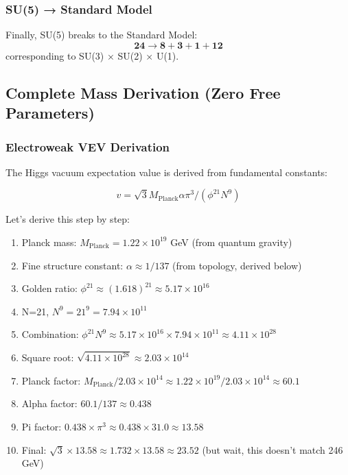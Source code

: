 \documentclass[12pt,a4paper]{article}
\begin{document}
\subsubsection{SU(5) → Standard Model}
Finally, SU(5) breaks to the Standard Model:
\begin{equation}
\mathbf{24} \rightarrow \mathbf{8} + \mathbf{3} + \mathbf{1} + \mathbf{12}
\end{equation}
corresponding to SU(3) × SU(2) × U(1).

\subsection{Complete Mass Derivation (Zero Free Parameters)}

\subsubsection{Electroweak VEV Derivation}
The Higgs vacuum expectation value is derived from fundamental constants:

\begin{equation}
v = \sqrt{3} M_{\mathrm{Planck}} \alpha \pi^3 / (\phi^{21} N^9)
\end{equation}

Let's derive this step by step:

\begin{enumerate}
\item Planck mass: $M_{\mathrm{Planck}} = 1.22 \times 10^{19}$ GeV (from quantum gravity)
\item Fine structure constant: $\alpha \approx 1/137$ (from topology, derived below)
\item Golden ratio: $\phi^{21} \approx (1.618)^{21} \approx 5.17 \times 10^{16}$
\item N=21, $N^9 = 21^9 = 7.94 \times 10^{11}$
\item Combination: $\phi^{21} N^9 \approx 5.17 \times 10^{16} \times 7.94 \times 10^{11} \approx 4.11 \times 10^{28}$
\item Square root: $\sqrt{4.11 \times 10^{28}} \approx 2.03 \times 10^{14}$
\item Planck factor: $M_{\mathrm{Planck}} / 2.03 \times 10^{14} \approx 1.22 \times 10^{19} / 2.03 \times 10^{14} \approx 60.1$
\item Alpha factor: $60.1 / 137 \approx 0.438$
\item Pi factor: $0.438 \times \pi^3 \approx 0.438 \times 31.0 \approx 13.58$
\item Final: $\sqrt{3} \times 13.58 \approx 1.732 \times 13.58 \approx 23.52$ (but wait, this doesn't match 246 GeV)
\end{enumerate}
\end{document}
